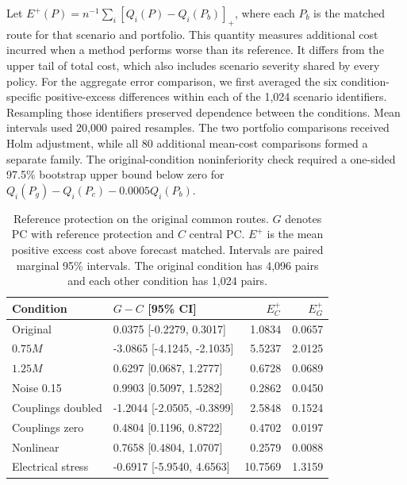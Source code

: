 \documentclass[journal]{IEEEtran}
\providecommand{\DIFadd}[1]{{\protect\color{blue}\uwave{#1}}} %
\newcommand{\DIFnewtablecolor}{\color{blue}}
\renewcommand{\DIFadd}[1]{{\color{blue}#1}}
\begin{document}
\DIFadd{Let $E^+(P)=n^{-1}\sum_i[Q_i(P)-Q_i(P_b)]_+$, where each $P_b$ is the
matched route for that scenario and portfolio.  This quantity measures
additional cost incurred when a method performs worse than its reference.
It differs from the upper tail of total cost, which also includes scenario
severity shared by every policy.  For the aggregate error comparison, we
first averaged the six condition-specific positive-excess differences
within each of the 1,024 scenario identifiers.  Resampling those identifiers
preserved dependence between the conditions.  Mean intervals used 20,000
paired resamples.  The two portfolio comparisons received Holm adjustment,
while all 80 additional mean-cost comparisons formed a separate family.
The original-condition noninferiority check required a one-sided 97.5\%
bootstrap upper bound below zero for
$Q_i(P_g)-Q_i(P_c)-0.0005Q_i(P_b)$.
}

\begin{table}[t]\DIFnewtablecolor
\centering
\caption{Reference protection on the original common routes. $G$ denotes PC with reference protection and $C$ central PC. $E^+$ is the mean positive excess cost above forecast matched. Intervals are paired marginal 95\% intervals. The original condition has 4,096 pairs and each other condition has 1,024 pairs.}
\label{tab:guarded-primary}
\footnotesize\setlength{\tabcolsep}{3pt}\renewcommand{\arraystretch}{1.12}
\begin{tabular}{@{}p{}p{}rr@{}}
\toprule
Condition & $G-C$ [95\% CI] & $E_C^+$ & $E_G^+$ \\
\midrule
Original & 0.0375 [-0.2279, 0.3017] & 1.0834 & 0.0657 \\
$0.75M$ & -3.0865 [-4.1245, -2.1035] & 5.5237 & 2.0125 \\
$1.25M$ & 0.6297 [0.0687, 1.2777] & 0.6728 & 0.0689 \\
Noise 0.15 & 0.9903 [0.5097, 1.5282] & 0.2862 & 0.0450 \\
Couplings doubled & -1.2044 [-2.0505, -0.3899] & 2.5848 & 0.1524 \\
Couplings zero & 0.4804 [0.1196, 0.8722] & 0.4702 & 0.0197 \\
Nonlinear & 0.7658 [0.4804, 1.0707] & 0.2579 & 0.0088 \\
Electrical stress & -0.6917 [-5.9540, 4.6563] & 10.7569 & 1.3159 \\
\bottomrule
\end{tabular}
\end{table}
\end{document}
